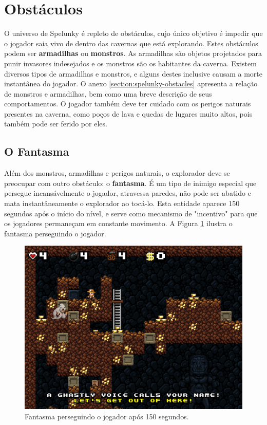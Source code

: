 \section{\label{section:spelunky-obstacles}Obstáculos}
O universo de Spelunky é repleto de obstáculos, cujo único objetivo é impedir
que o jogador saia vivo de dentro das cavernas que está explorando. Estes
obstáculos podem ser \textbf{armadilhas} ou \textbf{monstros}. As armadilhas são
objetos projetados para punir invasores indesejados e os monstros são os
habitantes da caverna. Existem diversos tipos de armadilhas e monstros, e alguns
destes inclusive causam a morte instantânea do jogador. O anexo
\ref{section:spelunky-obstacles} apresenta a relação de monstros e armadilhas,
bem como uma breve descrição de seus comportamentos. O jogador também deve ter
cuidado com os perigos naturais presentes na caverna, como poços de lava e
quedas de lugares muito altos, pois também pode ser ferido por eles.

\subsection{O Fantasma}
Além dos monstros, armadilhas e perigos naturais, o explorador deve se preocupar
com outro obstáculo: o \textbf{fantasma}. É um tipo de inimigo especial que
persegue incansávelmente o jogador, atravessa paredes, não pode ser abatido e
mata instantâneamente o explorador ao tocá-lo. Esta entidade aparece 150
segundos após o início do nível, e serve como mecanismo de "incentivo" para que
os jogadores permaneçam em constante movimento. A Figura
\ref{fig:spelunky-ghost} ilustra o fantasma perseguindo o jogador.

\begin{figure}[htb!]
\centering
\includegraphics[width=.65\textwidth]{fig/spelunky-ghost.png}
\caption{Fantasma perseguindo o jogador após 150 segundos.}
\label{fig:spelunky-ghost}
\end{figure}


